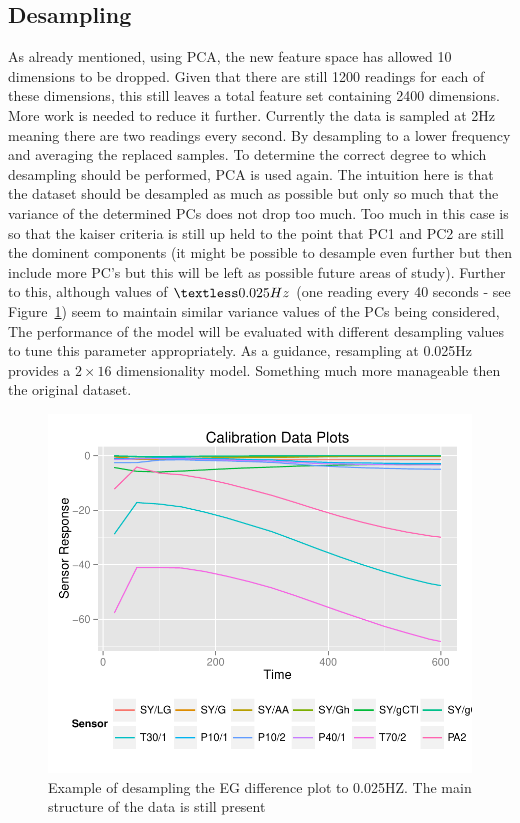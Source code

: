 \documentclass[twocolumn]{article}
\begin{document}
\subsection{Desampling}
\label{sec:desampling}
As already mentioned, using PCA, the new feature space has allowed 10 dimensions to be dropped. Given that there are still
1200 readings for each of these dimensions, this still leaves a total feature set containing 2400 dimensions. More work is needed
to reduce it further. Currently the data is sampled at 2Hz meaning there are two readings every second. By desampling to a lower 
frequency and averaging the replaced samples. To determine the correct degree to which desampling should be performed, PCA is used again.
The intuition here is that the dataset should be desampled as much as possible but only so much that the variance of the determined PCs
does not drop too much. Too much in this case is so that the kaiser criteria is still up held to the point that PC1 and PC2 are still
the dominent components (it might be possible to desample even further but then include more PC's but this will be left as possible future 
areas of study). Further to this, although values of $\textless 0.025Hz$ (one reading every 40 seconds - see Figure~\ref{fig:desampledExample}) seem to maintain similar variance values of the
PCs being considered, The performance of the model will be evaluated with different desampling values to tune this parameter appropriately.
As a guidance, resampling at 0.025Hz provides a $2 \times 16$ dimensionality model. Something much more manageable then the original dataset.

\begin{figure}[h!]
	\includegraphics[trim = 0mm 0mm 0mm 0mm, clip, scale=0.55]{deSampledExample.pdf}
	\caption{Example of desampling the EG difference plot to 0.025HZ. The main structure of the data is still present}
	\label{fig:desampledExample}
\end{figure}
\end{document}
